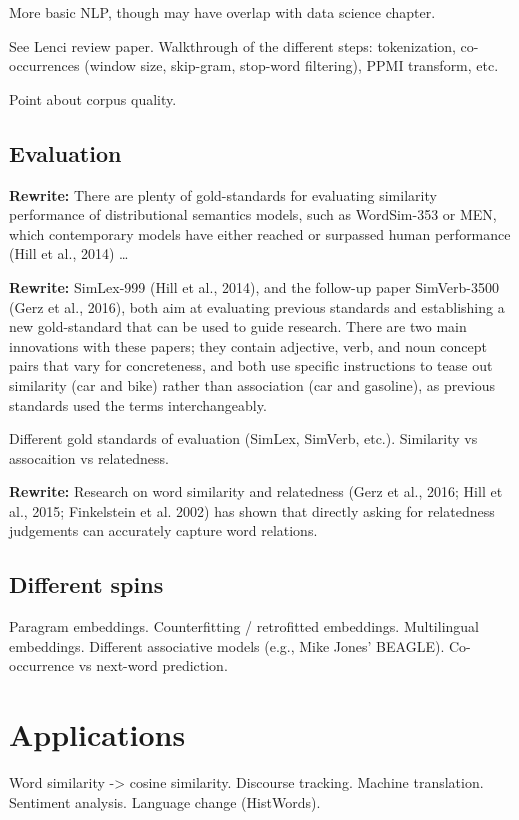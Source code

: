 More basic NLP, though may have overlap with data science chapter. 

See Lenci review paper.
Walkthrough of the different steps: tokenization, co-occurrences (window size, skip-gram, stop-word filtering), PPMI transform, etc.

Point about corpus quality.

\subsection{Evaluation}
\textbf{Rewrite:} There are plenty of gold-standards for evaluating similarity performance of distributional semantics models, such as WordSim-353 or MEN, which contemporary models have either reached or surpassed human performance (Hill et al., 2014) \dots 

\textbf{Rewrite:} SimLex-999 (Hill et al., 2014), and the follow-up paper SimVerb-3500 (Gerz et al., 2016), both aim at evaluating previous standards and establishing a new gold-standard that can be used to guide research. There are two main innovations with these papers; they contain adjective, verb, and noun concept pairs that vary for concreteness, and both use specific instructions to tease out similarity (car and bike) rather than association (car and gasoline), as previous standards used the terms interchangeably.

Different gold standards of evaluation (SimLex, SimVerb, etc.).
Similarity vs assocaition vs relatedness.

\textbf{Rewrite:} Research on word similarity and relatedness (Gerz et al., 2016; Hill et al., 2015; Finkelstein et al. 2002) has shown that directly asking for relatedness judgements can accurately capture word relations.

\subsection{Different spins}
Paragram embeddings.
Counterfitting / retrofitted embeddings.
Multilingual embeddings.
Different associative models (e.g., Mike Jones' BEAGLE).
Co-occurrence vs next-word prediction.

\section{Applications}
Word similarity -> cosine similarity.
Discourse tracking.
Machine translation.
Sentiment analysis.
Language change (HistWords).

